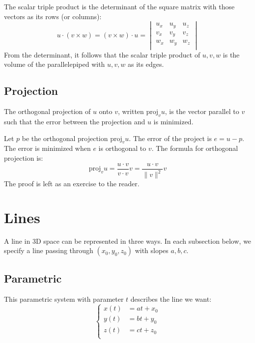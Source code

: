 \documentclass{article}
\begin{document}
The scalar triple product is the determinant of the square matrix with those vectors as its rows (or columns):
\begin{equation*}
	u\cdot(v\times w)
	=(v\times w)\cdot u
	=\begin{vmatrix}
		u_x & u_y & u_z \\
		v_x & v_y & v_z \\
		w_x & w_y & w_z \\
	\end{vmatrix}
\end{equation*}
From the determinant, it follows that the scalar triple product of $u,v,w$ is the volume of the parallelepiped with $u,v,w$ as its edges.

\subsection{Projection}

The orthogonal projection of $u$ onto $v$, written $\mathrm{proj}_v u$, is the vector parallel to $v$ such that the error between the projection and $u$ is minimized.

Let $p$ be the orthogonal projection $\mathrm{proj}_v u$. The error of the project is $e=u-p$. The error is minimized when $e$ is orthogonal to $v$. The formula for orthogonal projection is:
\begin{equation*}
	\mathrm{proj}_vu
	=\frac{u\cdot v}{v\cdot v}v
	=\frac{u\cdot v}{\lVert v \rVert ^2}v
\end{equation*}
The proof is left as an exercise to the reader.

\section{Lines}

A line in 3D space can be represented in three ways. In each subsection below, we specify a line passing through $(x_0,y_0,z_0)$ with slopes $a,b,c$.

\subsection{Parametric}

This parametric system with parameter $t$ describes the line we want:
\begin{equation*}
	\left\{\begin{aligned}
		x(t)&=at+x_0 \\
		y(t)&=bt+y_0 \\
		z(t)&=ct+z_0 \\
	\end{aligned}\right.
\end{equation*}
\end{document}
